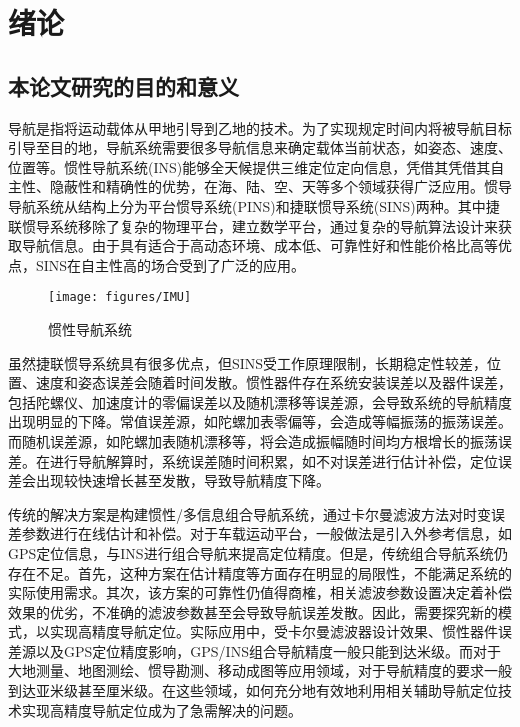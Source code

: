 \chapter{绪论}
\label{chap:intro}
\section{本论文研究的目的和意义}

导航是指将运动载体从甲地引导到乙地的技术。为了实现规定时间内将被导航目标引导至目的地，导航系统需要很多导航信息来确定载体当前状态，如姿态、速度、位置等。惯性导航系统(INS)能够全天候提供三维定位定向信息，凭借其凭借其自主性、隐蔽性和精确性的优势，在海、陆、空、天等多个领域获得广泛应用。惯导导航系统从结构上分为平台惯导系统(PINS)和捷联惯导系统(SINS)两种。其中捷联惯导系统移除了复杂的物理平台，建立数学平台，通过复杂的导航算法设计来获取导航信息。由于具有适合于高动态环境、成本低、可靠性好和性能价格比高等优点，SINS在自主性高的场合受到了广泛的应用。


\begin{figure}[!htp]
	\centering
	\texttt{[image: figures/IMU]}
	\caption{惯性导航系统}\label{fig:IMU}
\end{figure}


虽然捷联惯导系统具有很多优点，但SINS受工作原理限制，长期稳定性较差，位置、速度和姿态误差会随着时间发散。惯性器件存在系统安装误差以及器件误差，包括陀螺仪、加速度计的零偏误差以及随机漂移等误差源，会导致系统的导航精度出现明显的下降。常值误差源，如陀螺加表零偏等，会造成等幅振荡的振荡误差。而随机误差源，如陀螺加表随机漂移等，将会造成振幅随时间均方根增长的振荡误差。在进行导航解算时，系统误差随时间积累，如不对误差进行估计补偿，定位误差会出现较快速增长甚至发散，导致导航精度下降。

传统的解决方案是构建惯性/多信息组合导航系统，通过卡尔曼滤波方法对时变误差参数进行在线估计和补偿。对于车载运动平台，一般做法是引入外参考信息，如GPS定位信息，与INS进行组合导航来提高定位精度。但是，传统组合导航系统仍存在不足。首先，这种方案在估计精度等方面存在明显的局限性，不能满足系统的实际使用需求。其次，该方案的可靠性仍值得商榷，相关滤波参数设置决定着补偿效果的优劣，不准确的滤波参数甚至会导致导航误差发散。因此，需要探究新的模式，以实现高精度导航定位。实际应用中，受卡尔曼滤波器设计效果、惯性器件误差源以及GPS定位精度影响，GPS/INS组合导航精度一般只能到达米级。而对于大地测量、地图测绘、惯导勘测、移动成图等应用领域，对于导航精度的要求一般到达亚米级甚至厘米级。在这些领域，如何充分地有效地利用相关辅助导航定位技术实现高精度导航定位成为了急需解决的问题。

